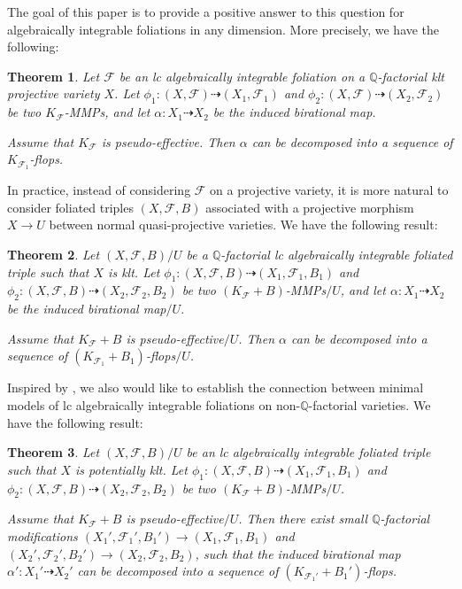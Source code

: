 \documentclass[preprint,12pt]{elsarticle}
\newcommand{\Qq}{\mathbb{Q}}
\newcommand{\Ff}{\mathcal{F}}
\newtheorem{thm}{Theorem}[section]
\begin{document}
The goal of this paper is to provide a positive answer to this question for algebraically integrable foliations in any dimension. More precisely, we have the following:


\begin{thm}\label{thm: main}
Let $\Ff$ be an lc algebraically integrable foliation on a $\Qq$-factorial klt projective variety $X$. Let $\phi_1: (X,\Ff)\dashrightarrow (X_1,\Ff_1)$ and $\phi_2: (X,\Ff)\dashrightarrow (X_2,\Ff_2)$ be two $K_{\Ff}$-MMPs, and let $\alpha: X_1\dashrightarrow X_2$ be the induced birational map. 

Assume that $K_{\Ff}$ is pseudo-effective. Then $\alpha$ can be decomposed into a sequence of $K_{\Ff_1}$-flops.
\end{thm}

In practice, instead of considering $\Ff$ on a projective variety, it is more natural to consider foliated triples $(X,\Ff,B)$ associated with a projective morphism  $X\rightarrow U$ between normal quasi-projective varieties. We have the following result:

\begin{thm}\label{thm: main triple}
Let $(X,\Ff,B)/U$ be a $\Qq$-factorial lc algebraically integrable foliated triple such that $X$ is klt. Let $\phi_1: (X,\Ff,B)\dashrightarrow (X_1,\Ff_1,B_1)$ and $\phi_2: (X,\Ff,B)\dashrightarrow (X_2,\Ff_2,B_2)$ be two $(K_{\Ff}+B)$-MMPs$/U$, and let $\alpha: X_1\dashrightarrow X_2$ be the induced birational map$/U$.

Assume that $K_{\Ff}+B$ is pseudo-effective$/U$. Then $\alpha$ can be decomposed into a sequence of $(K_{\Ff_1}+B_1)$-flops$/U$.
\end{thm}

Inspired by \cite[Theorem 1.2]{Has20}, we also would like to establish the connection between minimal models of lc algebraically integrable foliations on non-$\Qq$-factorial varieties. We have the following result:

\begin{thm}\label{thm: main non q factorial}
Let $(X,\Ff,B)/U$ be an lc algebraically integrable foliated triple such that $X$ is potentially klt. Let $\phi_1: (X,\Ff,B)\dashrightarrow (X_1,\Ff_1,B_1)$ and $\phi_2: (X,\Ff,B)\dashrightarrow (X_2,\Ff_2,B_2)$ be two $(K_{\Ff}+B)$-MMPs$/U$. 

Assume that $K_{\Ff}+B$ is pseudo-effective$/U$. Then there exist small $\Qq$-factorial modifications $(X_1',\Ff_1',B_1')\rightarrow (X_1,\Ff_1,B_1)$ and $(X_2',\Ff_2',B_2')\rightarrow (X_2,\Ff_2,B_2)$, such that the induced birational map $\alpha': X_1'\dashrightarrow X_2'$ can be decomposed into a sequence of $(K_{\Ff_1'}+B_1')$-flops.
\end{thm}
\end{document}
